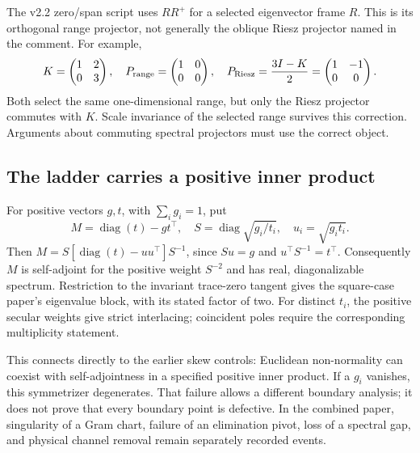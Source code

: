 The v2.2 zero/span script uses $R R^+$ for a selected eigenvector frame $R$. This is its orthogonal range projector, not generally the oblique Riesz projector named in the comment. For example,
\begin{equation}
K=\begin{pmatrix}1&2\\0&3\end{pmatrix},\quad
P_{\rm range}=\begin{pmatrix}1&0\\0&0\end{pmatrix},\quad
P_{\rm Riesz}=\frac{3I-K}{2}=\begin{pmatrix}1&-1\\0&0\end{pmatrix}.
\end{equation}
Both select the same one-dimensional range, but only the Riesz projector commutes with $K$. Scale invariance of the selected range survives this correction. Arguments about commuting spectral projectors must use the correct object.

\subsection{The ladder carries a positive inner product}
For positive vectors $g,t$, with $\sum_i g_i=1$, put
\begin{equation}
M=\operatorname{diag}(t)-gt^\top,\quad
S=\operatorname{diag}\sqrt{g_i/t_i},\quad u_i=\sqrt{g_it_i}.
\end{equation}
Then $M=S[\operatorname{diag}(t)-uu^\top]S^{-1}$, since $Su=g$ and $u^\top S^{-1}=t^\top$. Consequently $M$ is self-adjoint for the positive weight $S^{-2}$ and has real, diagonalizable spectrum. Restriction to the invariant trace-zero tangent gives the square-case paper's eigenvalue block, with its stated factor of two. For distinct $t_i$, the positive secular weights give strict interlacing; coincident poles require the corresponding multiplicity statement.

This connects directly to the earlier skew controls: Euclidean non-normality can coexist with self-adjointness in a specified positive inner product. If a $g_i$ vanishes, this symmetrizer degenerates. That failure allows a different boundary analysis; it does not prove that every boundary point is defective. In the combined paper, singularity of a Gram chart, failure of an elimination pivot, loss of a spectral gap, and physical channel removal remain separately recorded events.
